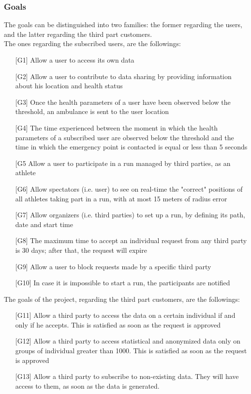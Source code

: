 \subsubsection{Goals}
The goals can be distinguished into two families: the former regarding the users, and the latter regarding the third part customers.\\
The ones regarding the subscribed users, are the followings:
\begin{enumerate}
\item[{[G1]}] Allow a user to access its own data
\item[{[G2]}] Allow a user to contribute to data sharing by providing information about his location and health status
\item[{[G3]}] Once the health parameters of a user have been observed 
below the threshold, an ambulance is sent to the user location 
\item[{[G4]}] The time experienced between the moment in which the health parameters of a subscribed user are observed below the threshold and the time in which the emergency point is contacted is equal or less than 5 seconds
\item[{[G5}] Allow a user to participate in a run managed by third parties, as an athlete
\item[{[G6]}] Allow spectators (i.e. user) to see on real-time the "correct" positions of all athletes taking part in a run, with at most 15 meters of radius error
\item[{[G7]}] Allow organizers (i.e. third parties) to set up a run, by defining its path, date and start time
\item[{[G8]}] The maximum time to accept an individual request from any third party is 30 days; after that, the request will expire
\item[{[G9]}] Allow a user to block requests made by a specific third party
\item[{[G10]}] In case it is impossible to start a run, the participants are notified
\end{enumerate}
The goals of the project, regarding the third part customers, are the followings:
\begin{enumerate}
\item[{[G11]}] Allow a third party to access the data on a certain individual if and only if he accepts. This is satisfied as soon as the request is approved
\item[{[G12]}] Allow a third party to access statistical and anonymized data only on groups of individual greater than 1000. This is satisfied as soon as the request is approved
\item[{[G13]}] Allow a third party to subscribe to non-existing data. They will have access to them, as soon as the data is generated. 
\end{enumerate}